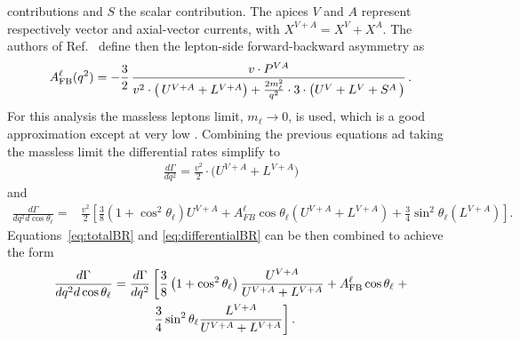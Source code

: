 contributions and $S$ the scalar contribution. The apices $V$ and $A$ represent respectively
vector and axial-vector currents, with $X^{V+A} = X^{V} + X^{A}$.
The authors of Ref.~\cite{Gutsche:2013pp} define then the lepton-side forward-backward asymmetry as
\begin{equation}
A_{\rm FB}^{\ell}(q^{2}) 
= - \frac{3}{2}\,\frac{v\cdot P^{VA}}
{v^{2}\cdot\big(\,U^{V+A}
+L^{V+A}\big)+\frac{2m_{\ell}^{2}}{q^{2}}\cdot 3 \cdot
\big(U^{V}+L^{V}
+S^{A}\,\big) }\,.
\label{eq:afbDef}
\end{equation}
%
%
%
%
For this analysis the massless leptons limit, $m_\ell \rightarrow 0$, is used, which is a good
approximation except at very low \qsq. Combining the previous equations ad taking the massless 
limit the differential rates simplify to
\begin{eqnarray}
\frac{d\Gamma}{d q^2}=
\frac{v^{2}}{2}\cdot\bigg( U^{V+A} + L^{V+A} \bigg)
\label{eq:totalBR}
\end{eqnarray}
and
\begin{align}
\frac{d\Gamma}{dq^2d\cos\theta_\ell}=&
\frac{v^2}{2} \left[ \frac{3}{8}\left(1+\cos^2\theta_\ell\right)U^{V+A}+
A_{FB}^\ell\cos\theta_\ell(U^{V+A} + L^{V+A})+
\frac{3}{4}\sin^2\theta_\ell \left(L^{V+A}\right) \right].
\label{eq:differentialBR}
\end{align}
%
%
Equations~\ref{eq:totalBR} and \ref{eq:differentialBR} can be then combined to achieve the form
\begin{align}
\frac{d\Gamma}{dq^2d\cos\theta_\ell}=
\frac{d\Gamma}{dq^2}&\left[
\frac{3}{8}\left(1+\cos^2\theta_\ell\right)\frac{U^{V+A}}{U^{V+A}+L^{V+A}}+A_{\rm FB}^\ell\cos\theta_\ell\right . +
 \nonumber \\
& \left. \frac{3}{4}\sin^2\theta_\ell\frac{L^{V+A}}{U^{V+A}+L^{V+A}}\right].
\end{align}
